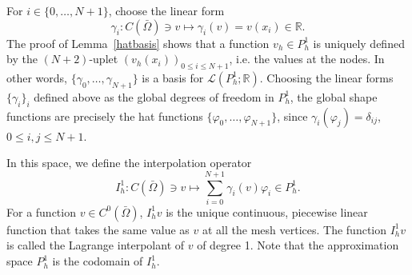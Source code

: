 \documentclass{article}
\begin{document}
For $i \in \{0, \dots, N+1\}$, choose the linear form
$$ \gamma_i: C(\bar{\Omega}) \ni v \mapsto \gamma_i(v) = v(x_i) \in \mathbb{R}.$$
The proof of Lemma~\ref{hatbasis} shows that a function $v_h \in P_h^1$ is uniquely defined by the $(N+2)$-uplet $(v_h(x_i))_{0 \le i \le N+1}$, i.e. the values at the nodes. In other words, $\{\gamma_0, \dots, \gamma_{N+1}\}$ is a basis for $\mathcal{L}(P_h^1; \mathbb{R})$. Choosing the linear forms $\{\gamma_i\}_i$ defined above as the global degrees of freedom in $P_h^1$, the global shape functions are precisely the hat functions $\{\varphi_0, \dots, \varphi_{N+1}\}$, since $\gamma_i(\varphi_j) = \delta_{ij}$, $0 \le i,j \le N+1$.

In this space, we define the interpolation operator
$$ I_h^1: C(\bar{\Omega}) \ni v \mapsto \sum_{i=0}^{N+1} \gamma_i(v) \varphi_i \in P_h^1.$$
For a function $v \in C^0(\bar{\Omega})$, $I_h^1 v$ is the unique continuous, piecewise linear function that takes the same value as $v$ at all the mesh vertices. The function $I_h^1 v$ is called the Lagrange interpolant of $v$ of degree 1. Note that the approximation space $P_h^1$ is the codomain of $I_h^1$. 
\end{document}
